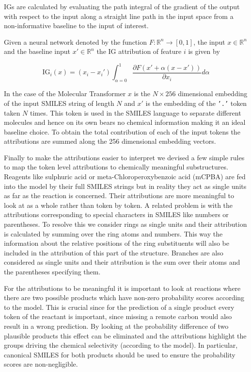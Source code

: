IGs are calculated by evaluating the path integral of the gradient of the output with respect to the input along a straight line path in the input space from a non-informative baseline to the input of interest.

Given a neural network denoted by the function $F:\mathbb{R}^n\to [0,1]$, the input $x\in\mathbb{R}^n$ and the baseline input $x'\in\mathbb{R}^n$ the IG attribution of feature $i$ is given by

\begin{equation}
\label{eqn:IG}
    \textrm{IG}_i(x) = (x_i - x_i') \int_{\alpha=0}^1 \frac{\partial F(x' + \alpha(x-x'))}{\partial x_i} d\alpha
\end{equation}

In the case of the Molecular Transformer $x$ is the $ N\times 256$ dimensional embedding of the input SMILES string of length $N$ and $x'$ is the embedding of the \texttt{'.'} token taken $N$ times. This token is used in the SMILES language to separate different molecules and hence on its own bears no chemical information making it an ideal baseline choice. To obtain the total contribution of each of the input tokens the attributions are summed along the 256 dimensional embedding vectors.

Finally to make the attributions easier to interpret we devised a few simple rules to map the token level attributions to chemically meaningful substructures. Reagents like sulphuric acid or meta-Chloroperoxybenzoic acid (mCPBA) are fed into the model by their full SMILES strings but in reality they act as single units as far as the reaction is concerned. Their attributions are more meaningful to look at as a whole rather than token by token. A related problem is with the attributions corresponding to special characters in SMILES like numbers or parentheses. To resolve this we consider rings as single units and their attribution is calculated by summing over the ring atoms and numbers. This way the information about the relative positions of the ring substituents will also be included in the attribution of this part of the structure. Branches are also considered as single units and their attribution is the sum over their atoms and the parentheses specifying them.

For the attributions to be meaningful it is important to look at reactions where there are two possible products which have non-zero probability scores according to the model. This is crucial since for the prediction of a single product every token of the reactant is important, since missing a remote carbon would also result in a wrong prediction. By looking at the probability difference of two plausible products this effect can be eliminated and the attributions highlight the groups driving the chemical selectivity (according to the model). In particular, canonical SMILES for both products should be used to ensure the probability scores are non-negligible.

